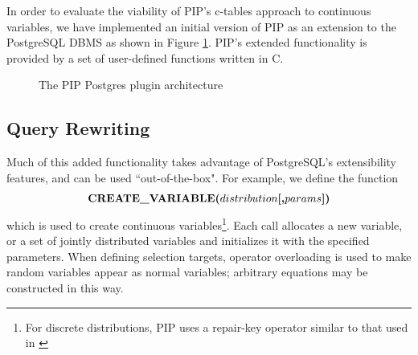 In order to evaluate the viability of PIP's c-tables approach to continuous variables, we have implemented an initial version of PIP as an extension to the PostgreSQL DBMS as shown in Figure \ref{fig:blockdiag}.  PIP's extended functionality is provided by a set of user-defined functions written in C.  

\begin{figure}
\begin{center}
\caption{The PIP Postgres plugin architecture}
\label{fig:blockdiag}
\end{center}
\vspace*{-0.3in}
\end{figure}

\subsection{Query Rewriting}
Much of this added functionality takes advantage of PostgreSQL's extensibility features, and can be used ``out-of-the-box".  For example, we define the function 
\[
\mbox{\textbf{CREATE\_VARIABLE($distribution$[,$params$])}}
\]
which is used to create continuous variables\footnote{For discrete distributions, PIP uses a repair-key operator similar to that used in \cite{KochMayBMS2008}}.  Each call allocates a new variable, or a set of jointly distributed variables and initializes it with the specified parameters.  When defining selection targets, operator overloading is used to make random variables appear as normal variables; arbitrary equations may be constructed in this way.  

